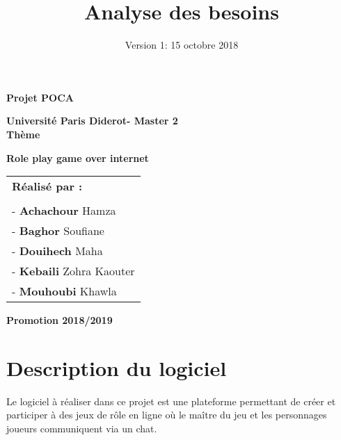 \documentclass[12pt,a4paper]{article}
\begin{document}
\begin{center}

 \vspace*{1cm}
  \LARGE
  \textbf{Projet POCA\\}
  \large
 
   \large
  	\vspace{2cm}
  \textbf{Université Paris Diderot- Master 2}\\
  \vspace{1cm}
  \LARGE
  \textbf{Thème}\\

  \LARGE
  \setlength{\fboxsep}{0.5cm}
  \begin{framed}
	\textbf{Role play game over internet}
  \end{framed}
  \vspace{2cm}
\begin{table}[H]
   \setlength{\tabcolsep}{2cm}
    \large
	\centering
	\begin{tabular}{l}
		\textbf{Réalisé par :}    
		 \\  \\
		 -\textbf{ Achachour} Hamza\\
		- \textbf{ Baghor } Soufiane\\
	
	-\textbf{ Douihech } Maha \\
		-\textbf{ Kebaili} Zohra Kaouter \\
		-\textbf{ Mouhoubi } Khawla \\
		
  

	\end{tabular}
  \end{table}
  \vspace{\fill}
  \large
  \textbf{Promotion 2018/2019}
   \end{center}
\title{\Huge{Analyse des besoins}}

\date{Version 1: 15 octobre 2018}
\newpage




\section{Description du logiciel}
\par Le logiciel à réaliser dans ce projet est une plateforme permettant de créer et participer à des jeux de rôle en ligne où le maître du jeu et les personnages joueurs communiquent via un chat.
\end{document}
